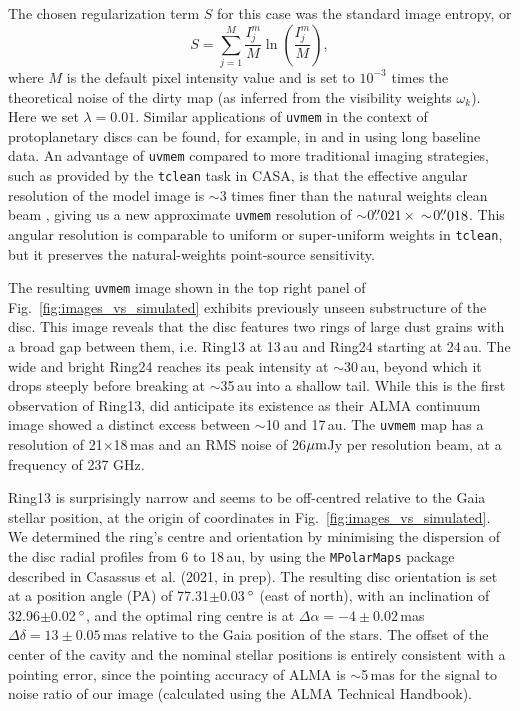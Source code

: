 \documentclass[fleqn,usenatbib,useAMS]{mnras}
\begin{document}
The chosen regularization term $S$ for this case was the standard image entropy, or
\begin{equation}
S = \sum_{j=1}^M \frac{I_j^m}{M} \ln\left(\frac{I_j^m}{M}\right),
\end{equation}
where $M$ is the default pixel intensity value and is set to $10^{-3}$ times the theoretical noise of the dirty map (as inferred from the visibility weights $\omega_k$). Here we set $\lambda = 0.01$. Similar applications of {\tt uvmem} in the context of protoplanetary discs can be found, for example, in \citet{Casassus2013Natur, 2018MNRAS.477.5104C, Casassus2019MNRAS.483.3278C, Perez2019AJ....158...15P} and in \citet{2020ApJ...889L..24P} using long baseline data. An advantage of {\tt uvmem} compared to more traditional imaging strategies, such as provided by the {\tt tclean} task in CASA, is that the effective angular resolution of the model image is $\sim$3 times finer than the natural weights clean beam \citep[][]{2018A&C....22...16C}, giving us a new approximate {\tt uvmem} resolution of $\sim$0$\hbox{$.\!\!^{\prime\prime}$}021 \,\times \,\sim$0$\hbox{$.\!\!^{\prime\prime}$}018$. This angular resolution is comparable to uniform or super-uniform weights in {\tt tclean}, but it preserves the natural-weights point-source sensitivity.

The resulting {\tt uvmem} image shown in the top right panel of Fig.~\ref{fig:images_vs_simulated} exhibits previously unseen substructure of the disc. This image reveals that the disc features two rings of large dust grains with a broad gap between them, i.e. Ring13 at 13\,au and Ring24 starting at 24\,au. The wide and bright Ring24 reaches its peak intensity at $\sim$30\,au, beyond which it drops steeply before breaking at $\sim$35\,au into a shallow tail. While this is the first observation of Ring13, \citet{Ru_z_Rodr_guez_2019} did anticipate its existence as their ALMA continuum image showed a distinct excess between $\sim$10 and 17\,au. The {\tt uvmem} map has a resolution of 21$\times$18\,mas and an RMS noise of 26$\hbox{$\mu$m}$Jy per resolution beam, at a frequency of 237 GHz.

Ring13 is surprisingly narrow and seems to be off-centred relative to the Gaia stellar position, at the origin of coordinates in Fig.~\ref{fig:images_vs_simulated}. We determined the ring's centre and orientation by minimising the dispersion of the disc radial profiles from 6 to 18\,au, by using the {\tt MPolarMaps} package described in Casassus et al. (2021, in prep). The resulting disc orientation is set at a position angle (PA) of 77.31$\pm$0.03\,$\hbox{$^\circ$}$ (east of north), with an inclination of 32.96$\pm$0.02\,$\hbox{$^\circ$}$, and the optimal ring centre is at $\Delta \alpha = -4\pm0.02$\,mas $\Delta \delta = 13\pm0.05$\,mas relative to the Gaia position of the stars. The offset of the center of the cavity and the nominal stellar positions is entirely consistent with a pointing error, since the pointing accuracy of ALMA is $\sim$5\,mas for the signal to noise ratio of our image (calculated using the ALMA Technical Handbook).
\end{document}
